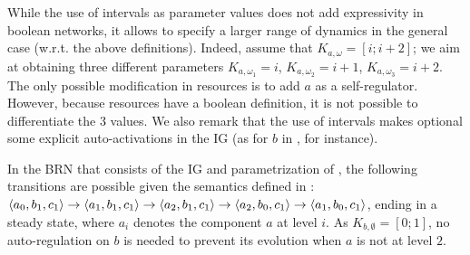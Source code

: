 While the use of intervals as parameter values does not add expressivity in boolean
networks, it allows to specify a larger range of dynamics in the general case (w.r.t. the above
definitions).
Indeed, assume that $K_{a,\omega} = [i ; i+2]$;
we aim at obtaining three different parameters $K_{a,\omega_1} = i$,  $K_{a,\omega_2} = i+1$, $K_{a,\omega_3} = i+2$.
The only possible modification in resources is to add $a$ as a self-regulator.
However, because resources have a boolean definition,
it is not possible to differentiate the 3 values.
We also remark that the use of intervals makes optional some explicit auto-activations in the IG
(as for $b$ in , for instance).

\begin{example*}
In the BRN that consists of the IG and parametrization of , the following
transitions are possible given the semantics defined in :
$\mbox{$\langle a_0, b_1, c_1 \rangle$} \rightarrow \mbox{$\langle a_1, b_1, c_1 \rangle$} \rightarrow \mbox{$\langle a_2, b_1, c_1 \rangle$} \rightarrow
\mbox{$\langle a_2, b_0, c_1 \rangle$} \rightarrow \mbox{$\langle a_1, b_0, c_1 \rangle$}$,
ending in a steady state,
where $a_i$ denotes the component $a$ at level $i$.
As $K_{b,\emptyset} = [0 ; 1]$, no auto-regulation on $b$ is needed to prevent its evolution when $a$ is not at level $2$.
\end{example*}

